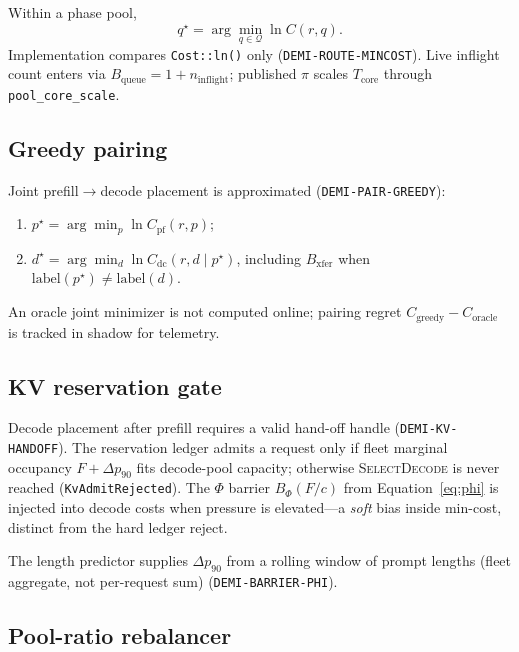 \documentclass[11pt,a4paper]{article}
\begin{document}
Within a phase pool,
\begin{equation}
  q^\star = \arg\min_{q \in \mathcal{Q}} \ln C(r,q).
\end{equation}
Implementation compares \texttt{Cost::ln()} only (\texttt{DEMI-ROUTE-MINCOST}).
Live inflight count enters via $B_{\mathrm{queue}} = 1 + n_{\mathrm{inflight}}$;
published $\pi$ scales $T_{\mathrm{core}}$ through \texttt{pool\_core\_scale}.

\subsection{Greedy pairing}

Joint prefill$\to$decode placement is approximated (\texttt{DEMI-PAIR-GREEDY}):
\begin{enumerate}[nosep]
  \item $p^\star = \arg\min_p \ln C_{\mathrm{pf}}(r,p)$;
  \item $d^\star = \arg\min_d \ln C_{\mathrm{dc}}(r,d \mid p^\star)$,
        including $B_{\mathrm{xfer}}$ when $\mathrm{label}(p^\star) \neq \mathrm{label}(d)$.
\end{enumerate}
An oracle joint minimizer is not computed online; pairing regret
$C_{\mathrm{greedy}} - C_{\mathrm{oracle}}$ is tracked in shadow for telemetry.

\subsection{KV reservation gate}

Decode placement after prefill requires a valid hand-off handle
(\texttt{DEMI-KV-HANDOFF}).
The reservation ledger admits a request only if fleet marginal occupancy
$F + \Delta p_{90}$ fits decode-pool capacity; otherwise
\textsc{SelectDecode} is never reached (\texttt{KvAdmitRejected}).
The $\Phi$ barrier $B_\Phi(F/c)$ from Equation~\eqref{eq:phi} is injected
into decode costs when pressure is elevated---a \emph{soft} bias inside
min-cost, distinct from the hard ledger reject.

The length predictor supplies $\Delta p_{90}$ from a rolling window of prompt
lengths (fleet aggregate, not per-request sum) (\texttt{DEMI-BARRIER-PHI}).

\subsection{Pool-ratio rebalancer}
\end{document}
